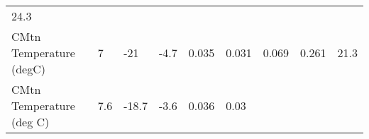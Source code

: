 \documentclass[11pt]{article}
\begin{document}
\begin{longtable}[]{@{}lllllllll@{}}
\begin{minipage}[t]{0.07\columnwidth}
24.3\strut
\end{minipage}\tabularnewline
\begin{minipage}[t]{0.25\columnwidth}\raggedright\strut
CMtn Temperature (degC)\strut
\end{minipage} & \begin{minipage}[t]{0.06\columnwidth}\raggedright\strut
7\strut
\end{minipage} & \begin{minipage}[t]{0.06\columnwidth}\raggedright\strut
-21\strut
\end{minipage} & \begin{minipage}[t]{0.08\columnwidth}\raggedright\strut
-4.7\strut
\end{minipage} & \begin{minipage}[t]{0.05\columnwidth}\raggedright\strut
0.035\strut
\end{minipage} & \begin{minipage}[t]{0.07\columnwidth}\raggedright\strut
0.031\strut
\end{minipage} & \begin{minipage}[t]{0.06\columnwidth}\raggedright\strut
0.069\strut
\end{minipage} & \begin{minipage}[t]{0.06\columnwidth}\raggedright\strut
0.261\strut
\end{minipage} & \begin{minipage}[t]{0.07\columnwidth}\raggedright\strut
21.3\strut
\end{minipage}\tabularnewline
\begin{minipage}[t]{0.25\columnwidth}\raggedright\strut
CMtn Temperature (deg C)\strut
\end{minipage} & \begin{minipage}[t]{0.06\columnwidth}\raggedright\strut
7.6\strut
\end{minipage} & \begin{minipage}[t]{0.06\columnwidth}\raggedright\strut
-18.7\strut
\end{minipage} & \begin{minipage}[t]{0.08\columnwidth}\raggedright\strut
-3.6\strut
\end{minipage} & \begin{minipage}[t]{0.05\columnwidth}\raggedright\strut
0.036\strut
\end{minipage} & \begin{minipage}[t]{0.07\columnwidth}\raggedright\strut
0.03\strut
\end{minipage} & \begin{minipage}[t]{0.06\columnwidth}\raggedright\strut

\end{minipage}
\end{longtable}
\end{document}
